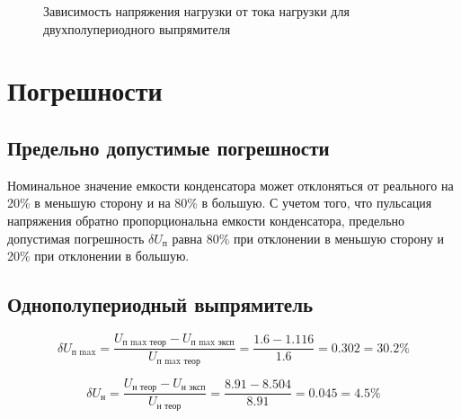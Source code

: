 \documentclass[a4paper,14pt]{extarticle}
\begin{document}
\vspace{-1.3cm}

\begin{figure}[H]
\begin{center}
	\captionsetup{justification=centering,margin=1cm}
	\caption{Зависимость напряжения нагрузки от тока нагрузки для двухполупериодного выпрямителя}\label{fig:full_wave_n}
\end{center}
\end{figure}

\section{Погрешности}

\subsection{Предельно допустимые погрешности}

Номинальное значение емкости конденсатора может отклоняться от реального на 20\% в меньшую сторону и на 80\% в большую. С учетом того, что пульсация напряжения обратно пропорциональна емкости конденсатора, предельно допустимая погрешность $\delta U_\text{п}$ равна 80\% при отклонении в меньшую сторону и 20\% при отклонении в большую.

\subsection{Однополупериодный выпрямитель}

\[
\delta U_\text{п max} = \frac{U_\text{п max\ \ теор} - U_\text{п max\ \ эксп}}{U_\text{п max\ \ теор}} = \frac{1.6 - 1.116}{1.6} = 0.302 = 30.2 \%
\]

\[
\delta U_\text{н} = \frac{U_\text{н\ \ теор} - U_\text{н\ \ эксп}}{U_\text{н\ \ теор}} = \frac{8.91 - 8.504}{8.91} = 0.045 = 4.5 \%
\]
\end{document}
